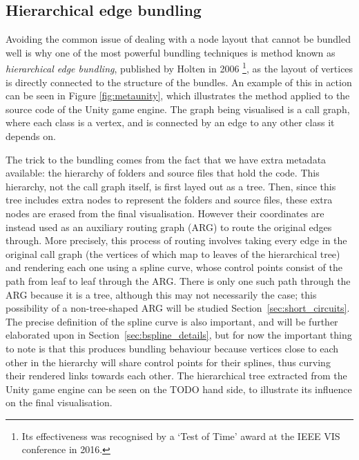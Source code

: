 \subsection{Hierarchical edge bundling}
\label{sec:heb_background}
Avoiding the common issue of dealing with a node layout that cannot be bundled well is why one of the most powerful bundling techniques is method known as \emph{hierarchical edge bundling}, published by Holten in 2006 \cite{Holten2006}\footnote{Its effectiveness was recognised by a `Test of Time' award at the IEEE VIS conference in 2016.}, as the layout of vertices is directly connected to the structure of the bundles.
An example of this in action can be seen in Figure \ref{fig:metaunity}, which illustrates the method applied to the source code of the Unity game engine. The graph being visualised is a call graph, where each class is a vertex, and is connected by an edge to any other class it depends on. 

The trick to the bundling comes from the fact that we have extra metadata available: the hierarchy of folders and source files that hold the code.
This hierarchy, not the call graph itself, is first layed out as a tree. Then, since this tree includes extra nodes to represent the folders and source files, these extra nodes are erased from the final visualisation. However their coordinates are instead used as an auxiliary routing graph (ARG) to route the original edges through.
More precisely, this process of routing involves taking every edge in the original call graph (the vertices of which map to leaves of the hierarchical tree) and rendering each one using a spline curve, whose control points consist of the path from leaf to leaf through the ARG. There is only one such path through the ARG because it is a tree, although this may not necessarily the case; this possibility of a non-tree-shaped ARG will be studied Section~\ref{sec:short_circuits}. The precise definition of the spline curve is also important, and will be further elaborated upon in Section~\ref{sec:bspline_details}, but for now the important thing to note is that this produces bundling behaviour because vertices close to each other in the hierarchy will share control points for their splines, thus curving their rendered links towards each other.
The hierarchical tree extracted from the Unity game engine can be seen on the TODO hand side, to illustrate its influence on the final visualisation.

